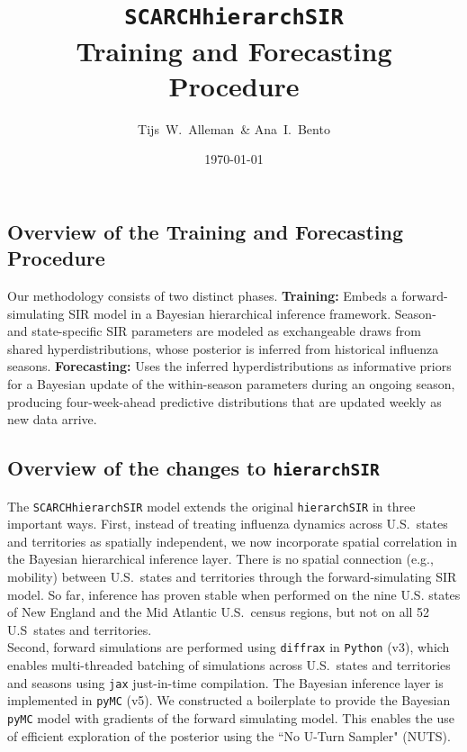 \documentclass[11pt]{article}
\title{\texttt{SCARCHhierarchSIR}\\Training and Forecasting Procedure}
\author{Tijs~W.~Alleman~\& Ana~I.~Bento}
\date{\today}
\begin{document}
\maketitle


\subsection*{Overview of the Training and Forecasting Procedure}

Our methodology consists of two distinct phases. \textbf{Training:} Embeds a forward-simulating SIR model in a Bayesian hierarchical inference framework. Season- and state-specific SIR parameters are modeled as exchangeable draws from shared hyperdistributions, whose posterior is inferred from historical influenza seasons. \textbf{Forecasting:} Uses the inferred hyperdistributions as informative priors for a Bayesian update of the within-season parameters during an ongoing season, producing four-week-ahead predictive distributions that are updated weekly as new data arrive.


\subsection*{Overview of the changes to \texttt{hierarchSIR}}

The \texttt{SCARCHhierarchSIR} model extends the original \texttt{hierarchSIR} in three important ways. First, instead of treating influenza dynamics across U.S.\ states and territories as spatially independent, we now incorporate spatial correlation in the Bayesian hierarchical inference layer. There is no spatial connection (e.g., mobility) between U.S.\ states and territories through the forward-simulating SIR model. So far, inference has proven stable when performed on the nine U.S. states of New England and the Mid Atlantic U.S.\ census regions, but not on all 52 U.S\ states and territories.\\

Second, forward simulations are performed using \texttt{diffrax} in \texttt{Python} (v3), which enables multi-threaded batching of simulations across U.S.\ states and territories and seasons using \texttt{jax} just-in-time compilation. The Bayesian inference layer is implemented in \texttt{pyMC} (v5). We constructed a boilerplate to provide the Bayesian \texttt{pyMC} model with gradients of the forward simulating model. This enables the use of efficient exploration of the posterior using the ``No U-Turn Sampler" (NUTS).\\
\end{document}
